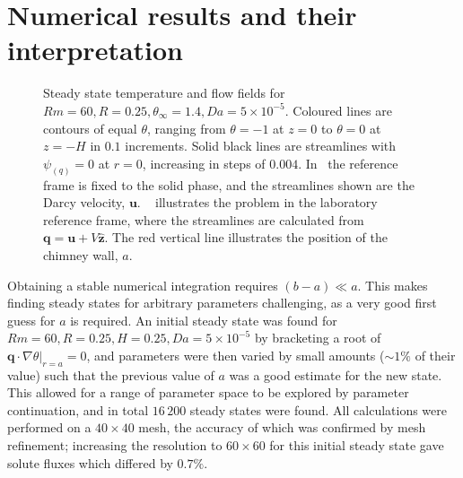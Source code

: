 \documentclass[11pt]{proc}
\begin{document}
\section{Numerical results and their interpretation}
\label{sec:results}

\begin{figure}[t!]
\centering
\captionsetup[subfigure]{position=top,singlelinecheck=off,justification=raggedright, aboveskip=-14pt,belowskip=0pt}
\begin{subfigure}[t]{.48\linewidth}
	\centering
   	\setlength\figureheight{5cm} 
	\setlength\figurewidth{6.5cm}
	\caption{}
	
    	\label{subfig:steady-state-darcy}
 \end{subfigure}
 \quad
 \begin{subfigure}[t]{.48\linewidth}
    	\centering
    	\setlength\figureheight{5cm} 
	\setlength\figurewidth{6.5cm}
	\caption{}
	 
    	\label{subfig:steady-state-q}
 \end{subfigure}
 
 \setlength{\abovecaptionskip}{-10pt} %
\setlength{\belowcaptionskip}{-7pt} %
 
 \caption{Steady state temperature and flow fields for $Rm=60, R=0.25, \theta_\infty=1.4, Da=5\times10^{-5}$. Coloured lines are contours of equal $\theta$, ranging from $\theta=-1$ at $z=0$ to $\theta=0$ at $z=-H$ in $0.1$ increments. Solid black lines are streamlines with $\psi_{(q)} = 0$ at $r=0$, increasing in steps of $0.004$. In~ the reference frame is fixed to the solid phase, and the streamlines shown are the Darcy velocity, $\mathbf{u}$. ~  illustrates the problem in the laboratory reference frame, where the streamlines are calculated from $\mathbf{q} = \mathbf{u} + V \mathbf{\hat{z}}$. The red vertical line illustrates the position of the chimney wall, $a$.}
\label{fig:typical-steady-states}
 \end{figure}


Obtaining a stable numerical integration requires $(b-a) \ll a$. This makes finding steady states for arbitrary parameters challenging, as a very good first guess for $a$ is required. An initial steady state was found for $Rm = 60, R=0.25, H=0.25, Da=5\times 10^{-5}$ by bracketing a root of $\left. \mathbf{q} \cdot \nabla \theta \right|_{r=a} = 0$, and parameters were then varied by small amounts ($\sim 1\%$ of their value) such that the previous value of $a$ was a good estimate for the new state. This allowed for a range of parameter space to be explored by parameter continuation, and in total $16\,200$ steady states were found. All calculations were performed on a $40\times40$ mesh, the accuracy of which was confirmed by mesh refinement; increasing the resolution to $60\times60$ for this initial steady state gave solute fluxes which differed by $0.7\%$.
\end{document}
